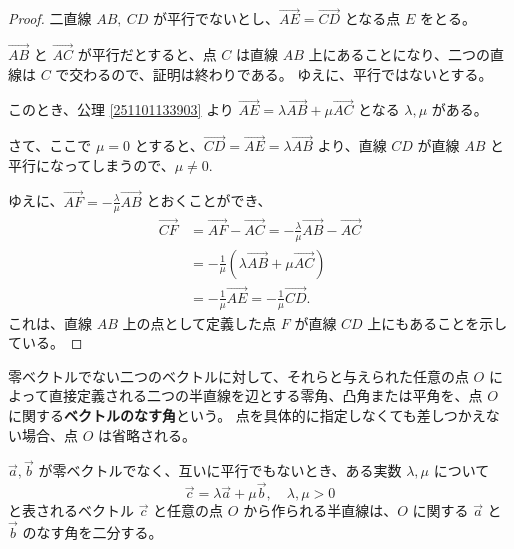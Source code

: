 \begin{proof}
  二直線 \(AB,\:CD\) が平行でないとし、\(\overrightarrow{AE}=\overrightarrow{CD}\) となる点 \(E\) をとる。

  \(\overrightarrow{AB}\) と \(\overrightarrow{AC}\) が平行だとすると、点 \(C\) は直線 \(AB\) 上にあることになり、二つの直線は \(C\) で交わるので、証明は終わりである。
  ゆえに、平行ではないとする。

  このとき、公理 \ref{251101133903} より \(\overrightarrow{AE}=\lambda\overrightarrow{AB}+\mu\overrightarrow{AC}\) となる \(\lambda,\mu\) がある。

  さて、ここで \(\mu=0\) とすると、\(\overrightarrow{CD}=\overrightarrow{AE}=\lambda\overrightarrow{AB}\) より、直線 \(CD\) が直線 \(AB\) と平行になってしまうので、\(\mu\neq0.\)

  ゆえに、\(\displaystyle \overrightarrow{AF}=-\frac{\lambda}{\mu}\overrightarrow{AB}\) とおくことができ、
  \begin{align*}
    \overrightarrow{CF} &= \overrightarrow{AF}-\overrightarrow{AC}=-\frac{\lambda}{\mu}\overrightarrow{AB}-\overrightarrow{AC} \\
                        &= -\frac{1}{\mu}(\lambda\overrightarrow{AB}+\mu\overrightarrow{AC}) \\
                        &= -\frac{1}{\mu}\overrightarrow{AE}=-\frac{1}{\mu}\overrightarrow{CD}.
  \end{align*}
  これは、直線 \(AB\) 上の点として定義した点 \(F\) が直線 \(CD\) 上にもあることを示している。
\end{proof}

\begin{dfn}[ベクトルのなす角]
  零ベクトルでない二つのベクトルに対して、それらと与えられた任意の点 \(O\) によって直接定義される二つの半直線を辺とする零角、凸角または平角を、点 \(O\) に関する\textbf{ベクトルのなす角}という。
  点を具体的に指定しなくても差しつかえない場合、点 \(O\) は省略される。
\end{dfn}

\begin{thm}\label{251101144602}
 \(\vec{a},\vec{b}\) が零ベクトルでなく、互いに平行でもないとき、ある実数 \(\lambda,\mu\) について
 \[\vec{c}=\lambda\vec{a}+\mu\vec{b},\quad \lambda,\mu>0\]
 と表されるベクトル \(\vec{c}\) と任意の点 \(O\) から作られる半直線は、\(O\) に関する \(\vec{a}\) と \(\vec{b}\) のなす角を二分する。
\end{thm}

